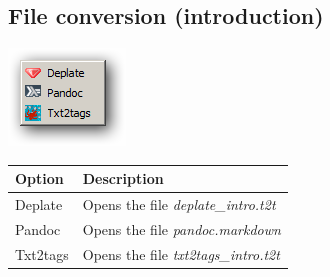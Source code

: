 \hypertarget{menu_help_main_fileconversion}{}
\subsection{File conversion (introduction)}

\includegraphics[scale=0.50]{./res/menu_help_conversion.png}\\

\begin{scriptsize}\begin{tabularx}{\textwidth}{>{\hsize=0.3\hsize}X>{\hsize=0.7\hsize}X}\\
    \hline
    \textbf{Option} & \textbf{Description} \\
    \hline
    Deplate & Opens the file \textit{deplate\_intro.t2t} \\
    Pandoc & Opens the file \textit{pandoc.markdown} \\
    Txt2tags & Opens the file \textit{txt2tags\_intro.t2t} \\
    \hline
  \end{tabularx}\end{scriptsize}
